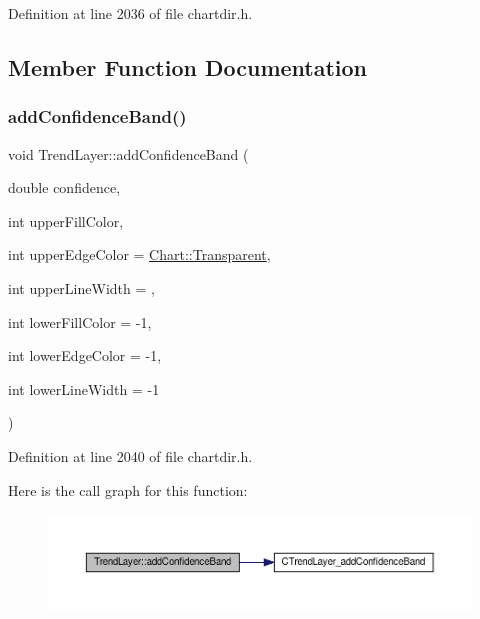 Definition at line 2036 of file chartdir.\+h.



\subsection{Member Function Documentation}
\mbox{\label{class_trend_layer_a9fb641824e98e2626bd8ee253c5f906b}} 
\subsubsection{\texorpdfstring{add\+Confidence\+Band()}{addConfidenceBand()}}
{\footnotesize\ttfamily void Trend\+Layer\+::add\+Confidence\+Band (\begin{DoxyParamCaption}\item[{double}]{confidence,  }\item[{int}]{upper\+Fill\+Color,  }\item[{int}]{upper\+Edge\+Color = {\ttfamily \hyperlink{namespace_chart_abee0d882fdc9ad0b001245ad9fc64011afc6811800a9e2582dac0157b6279f836}{Chart\+::\+Transparent}},  }\item[{int}]{upper\+Line\+Width = {},  }\item[{int}]{lower\+Fill\+Color = {\ttfamily -\/1},  }\item[{int}]{lower\+Edge\+Color = {\ttfamily -\/1},  }\item[{int}]{lower\+Line\+Width = {\ttfamily -\/1} }\end{DoxyParamCaption})\hspace{0.3cm}{\ttfamily [inline]}}



Definition at line 2040 of file chartdir.\+h.

Here is the call graph for this function\+:
\nopagebreak
\begin{figure}[H]
\begin{center}
\leavevmode
\includegraphics[width=350pt]{class_trend_layer_a9fb641824e98e2626bd8ee253c5f906b_cgraph}
\end{center}
\end{figure}
\mbox{\label{class_trend_layer_a9d6da57188ba79e09d52cd8064a9a6fb}} 
